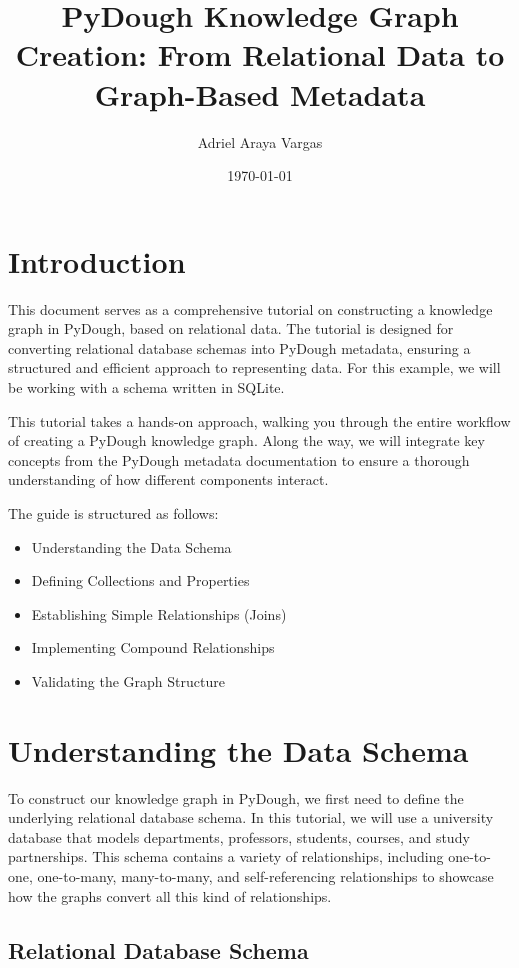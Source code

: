 \documentclass{article}
\title{PyDough Knowledge Graph Creation: From Relational Data to Graph-Based Metadata}
\author{Adriel Araya Vargas}
\date{\today}
\begin{document}
\maketitle

\section{Introduction}

This document serves as a comprehensive tutorial on constructing a knowledge graph in PyDough, based on relational data. The tutorial is designed for converting relational database schemas into PyDough metadata, ensuring a structured and efficient approach to representing data. For this example, we will be working with a schema written in SQLite. 

This tutorial takes a hands-on approach, walking you through the entire workflow of creating a PyDough knowledge graph. Along the way, we will integrate key concepts from the PyDough metadata documentation to ensure a thorough understanding of how different components interact. 

The guide is structured as follows:
\begin{itemize}
    \item Understanding the Data Schema
    \item Defining Collections and Properties
    \item Establishing Simple Relationships (Joins)
    \item Implementing Compound Relationships
    \item Validating the Graph Structure
\end{itemize}

\section{Understanding the Data Schema}

To construct our knowledge graph in PyDough, we first need to define the underlying relational database schema. In this tutorial, we will use a university database that models departments, professors, students, courses, and study partnerships. This schema contains a variety of relationships, including one-to-one, one-to-many, many-to-many, and self-referencing relationships to showcase how the graphs convert all this kind of relationships.

\subsection{Relational Database Schema}
\end{document}
